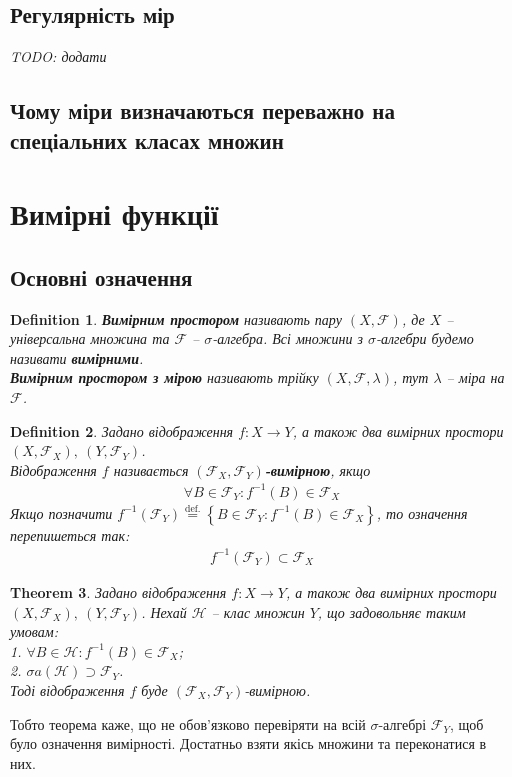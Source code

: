 \documentclass[a4paper, 10pt]{article}
\theoremstyle{theoremdd}
\newtheorem{theorem}{Theorem}[subsection]
\newtheorem{definition}[theorem]{Definition}
\begin{document}
\subsection{Регулярність мір}
\textit{TODO: додати}

\subsection*{Чому міри визначаються переважно на спеціальних класах множин}
\newpage

\section{Вимірні функції}
\subsection{Основні означення}
\begin{definition}
\textbf{Вимірним простором} називають пару $(X,\mathcal{F})$, де $X$ -- універсальна множина та $\mathcal{F}$ -- $\sigma$-алгебра. Всі множини з $\sigma$-алгебри будемо називати \textbf{вимірними}.\\
\textbf{Вимірним простором з мірою} називають трійку $(X,\mathcal{F},\lambda)$, тут $\lambda$ -- міра на $\mathcal{F}$.
\end{definition}

\begin{definition}
Задано відображення $f \colon X \to Y$, а також два вимірних простори $(X,\mathcal{F}_X),\ (Y,\mathcal{F}_Y)$.\\
Відображення $f$ називається \textbf{$(\mathcal{F}_X,\mathcal{F}_Y)$-вимірною}, якщо
\begin{align*}
\forall B \in \mathcal{F}_Y: f^{-1}(B) \in \mathcal{F}_X
\end{align*}
Якщо позначити $f^{-1}(\mathcal{F}_Y) \overset{\text{def.}}{=} \left\{ B \in \mathcal{F}_Y : f^{-1}(B) \in \mathcal{F}_X \right\}$, то означення перепишеться так:
\begin{align*}
f^{-1}(\mathcal{F}_Y) \subset \mathcal{F}_X
\end{align*}
\end{definition}

\begin{theorem}
Задано відображення $f \colon X \to Y$, а також два вимірних простори $(X,\mathcal{F}_X),\ (Y,\mathcal{F}_Y)$. Нехай $\mathcal{H}$ -- клас множин $Y$, що задовольняє таким умовам:\\
1. $\forall B \in \mathcal{H}: f^{-1}(B) \in \mathcal{F}_X$;\\
2. $\sigma a(\mathcal{H}) \supset \mathcal{F}_Y$.\\
Тоді відображення $f$ буде $(\mathcal{F}_X,\mathcal{F}_Y)$-вимірною.
\end{theorem}
\noindent Тобто теорема каже, що не обов'язково перевіряти на всій $\sigma$-алгебрі $\mathcal{F}_Y$, щоб було означення вимірності. Достатньо взяти якісь множини та переконатися в них.
\end{document}
